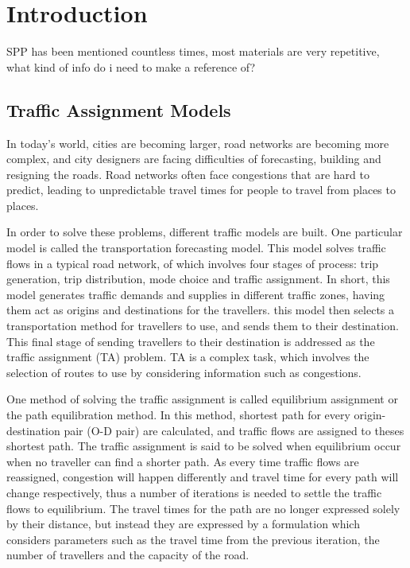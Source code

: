 \chapter{Introduction}
{
    SPP has been mentioned countless times,
    most materials are very repetitive,
    what kind of info do i need to make a reference of?
}
\section{Traffic Assignment Models}

In today's world, cities are becoming larger, 
road networks are becoming more complex,
and city designers are facing difficulties of 
forecasting, building and resigning the roads.
Road networks often face congestions that are hard to predict,
leading to unpredictable travel times for people to travel from places to places.

In order to solve these problems,
different traffic models are built.
One particular model is called the transportation forecasting model.
This model solves traffic flows in a typical road network,
of which involves four stages of process: trip generation,
trip distribution, mode choice and traffic assignment.
In short,
this model generates traffic demands and supplies in different traffic zones,
having them act as origins and destinations for the travellers.
this model then selects a transportation method for travellers
to use, and sends them to their destination.
This final stage of sending travellers to their destination is
addressed as the traffic assignment (TA) problem.
TA is a complex task,
which involves the selection of routes to use by considering information such as congestions.

One method of solving the traffic assignment is called 
equilibrium assignment or the path equilibration method.
In this method, 
shortest path for every origin-destination pair (O-D pair) are calculated, 
and traffic flows are assigned to theses shortest path.
The traffic assignment is said to be solved when equilibrium occur when no traveller can find a shorter path.
As every time traffic flows are reassigned,
congestion will happen differently and 
travel time for every path will change respectively,
thus a number of iterations is needed to settle the traffic flows
to equilibrium.
The travel times for the path are no longer expressed solely by their
distance,
but instead they are expressed by a formulation which considers
parameters such as the travel time from the previous iteration,
the number of travellers and the capacity of the road.

